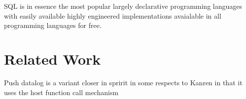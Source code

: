 SQL is in essence the most popular largely declarative programming languages
with easily available highly engineered implementations avaialable in all programming languages
for free.

\cite{hytradboi}
\cite{Kiselyov}










\section{Related Work}

Push datalog is a variant closer in spririt in some respects to Kanren in that it uses the host function call mechanism



%

\cite{https://www.philipzucker.com/notes/Languages/datalog/}

\cite{oatlog}
\cite{yihong egglite}